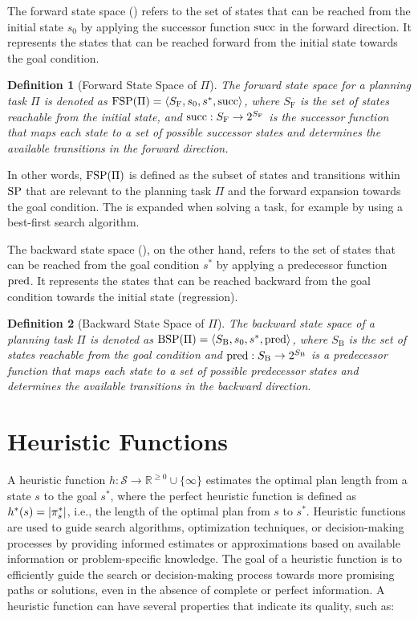 \documentclass[ppgc,diss,english]{iiufrgs}
\newtheorem{definition}{Definition}
\begin{document}
The forward state space (\fsp) refers to the set of states that can be reached from the initial state $s_0$ by applying the successor function $\operatorname{succ}$ in the forward direction. It represents the states that can be reached forward from the initial state towards the goal condition.

\begin{definition}[Forward State Space of $\Pi$]
The forward state space for a planning task $\Pi$ is denoted as ${\text{FSP}}(\Pi) = \langle S_{\text{F}}, s_0, s^{*}, \operatorname{succ} \rangle$, where $S_{\text{F}}$ is the set of states reachable from the initial state, and $\operatorname{succ} : S_{\text{F}} \to 2^{S_{\text{F}}}$ is the successor function that maps each state to a set of possible successor states and determines the available transitions in the forward direction.
\end{definition}

In other words, ${\text{FSP}}(\Pi)$ is defined as the subset of states and transitions within ${\text{SP}}$ that are relevant to the planning task $\Pi$ and the forward expansion towards the goal condition. The \fsp is expanded when solving a task, for example by using a best-first search algorithm.

The backward state space (\bsp), on the other hand, refers to the set of states that can be reached from the goal condition $s^{*}$ by applying a predecessor function $\operatorname{pred}$. It represents the states that can be reached backward from the goal condition towards the initial state (regression).

\begin{definition}[Backward State Space of $\Pi$]
The backward state space of a planning task $\Pi$ is denoted as ${\text{BSP}}(\Pi) = \langle S_{\text{B}}, s_{0}, s^{*}, \operatorname{pred} \rangle$, where $S_{\text{B}}$ is the set of states reachable from the goal condition and $\operatorname{pred} : S_{\text{B}} \to 2^{S_{\text{B}}}$ is a predecessor function that maps each state to a set of possible predecessor states and determines the available transitions in the backward direction.
\end{definition}


\section{Heuristic Functions}
\label{sec:background-heuristics}
A heuristic function $h:\mathcal{S}\rightarrow \mathbb{R}^{\geq 0}\cup\{\infty\}$ estimates the optimal plan length from a state $s$ to the goal $s^*$, where the perfect heuristic function is defined as $h^{*}(s) = |\pi_{s}^{*}|$, i.e., the length of the optimal plan from $s$ to $s^{*}$. Heuristic functions are used to guide search algorithms, optimization techniques, or decision-making processes by providing informed estimates or approximations based on available information or problem-specific knowledge. The goal of a heuristic function is to efficiently guide the search or decision-making process towards more promising paths or solutions, even in the absence of complete or perfect information. A heuristic function can have several properties that indicate its quality, such as:
\end{document}
